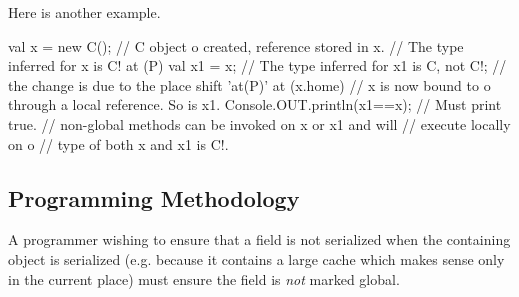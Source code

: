 Here is another example.
\begin{xten}
val x = new C(); 
// C object o created, reference stored in x. 
// The type inferred for x is C!
at (P) { 
    val x1 = x; 
    // The type inferred for x1 is C, not C!;
    // the change is due to the place shift 'at(P)'
  at (x.home) {
        // x is now bound to o through a local reference. So is x1.
    Console.OUT.println(x1==x); // Must print true.
      // non-global methods can be invoked on x or x1 and will 
      // execute locally on o
      // type of both x and x1 is C!.
  }
}
\end{xten}
 
\subsection{Programming Methodology}

A programmer wishing to ensure that a  field is not serialized when
the containing object is serialized (e.g. because it contains a large
cache which makes sense only in the current place) must ensure the
field is \emph{not} marked global.


